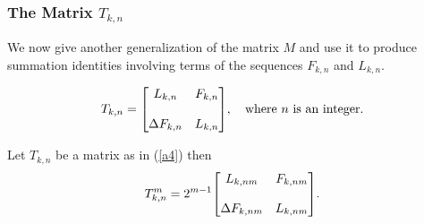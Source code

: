 \subsubsection{{The Matrix $T_{k,n}$ }}
We now give another generalization of the matrix $M$ and use it to produce summation identities involving terms of the sequences $F_{k,n}$ and $L_{k,n}$. 
\begin{definition}\label{a4}
\begin{align}
 T_{k,n} = {\begin{bmatrix}
            L_{k,n} & F_{k,n}\bigskip \\
            \Delta F_{k,n} & L_{k,n} 
          \end{bmatrix}
     }, \quad \text{where  $n$ is an integer.}
\end{align}
\end{definition}
\begin{theorem} Let $T_{k,n}$ be a matrix as in (\ref{a4}) then 
\begin{align}
 T_{k,n}^m = 2^{m-1}{
          \begin{bmatrix}
            L_{k,nm} & F_{k,nm} \bigskip\\
            \Delta F_{k,nm} & L_{k,nm} 
          \end{bmatrix}
        }.
\end{align}
\end{theorem}
